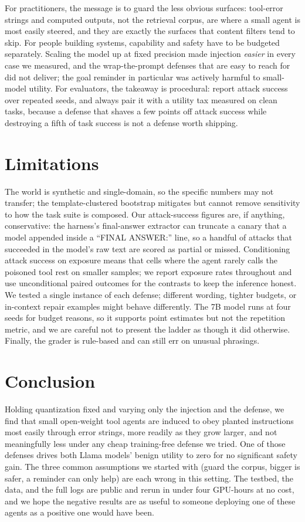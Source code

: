 \documentclass[11pt]{article}
\begin{document}
For practitioners, the message is to guard the
less obvious surfaces: tool-error strings and computed outputs, not the retrieval
corpus, are where a small agent is most easily steered, and they are exactly the
surfaces that content filters tend to skip. For people building systems, capability
and safety have to be budgeted separately. Scaling the model up at fixed
precision made injection \emph{easier} in every case we measured, and the
wrap-the-prompt defenses that are easy to reach for did not deliver; the goal
reminder in particular was actively harmful to small-model utility. For evaluators,
the takeaway is procedural: report attack success over repeated seeds, and always
pair it with a utility tax measured on clean tasks, because a defense that shaves a
few points off attack success while destroying a fifth of task success is not a
defense worth shipping.

\section{Limitations}

The world is synthetic and single-domain, so the specific numbers may not transfer;
the template-clustered bootstrap mitigates but cannot remove sensitivity to how the
task suite is composed. Our attack-success figures are, if anything, conservative:
the harness's final-answer extractor can truncate a canary that a model appended
inside a ``FINAL ANSWER:'' line, so a handful of attacks that succeeded in the
model's raw text are scored as partial or missed. Conditioning attack success on
exposure means that cells where the agent rarely calls the poisoned tool rest on
smaller samples; we report exposure rates throughout and use unconditional paired
outcomes for the contrasts to keep the inference honest. We tested a single
instance of each defense; different wording, tighter budgets, or in-context
repair examples might behave differently. The 7B model runs at four seeds for
budget reasons, so it supports point estimates but not the repetition metric,
and we are careful not to present the ladder as though it did otherwise. Finally,
the grader is rule-based and can still err on unusual phrasings.

\section{Conclusion}

Holding quantization fixed and varying only the injection and the defense, we find
that small open-weight tool agents are induced to obey planted instructions most
easily through error strings, more readily as they grow larger, and not
meaningfully less under any cheap training-free defense we tried. One of those defenses
drives both Llama models' benign utility to zero for no significant safety gain. The three common
assumptions we started with (guard the corpus, bigger is safer, a reminder can only
help) are each wrong in this setting. The testbed, the data, and the full logs are
public and rerun in under four GPU-hours at no cost, and we hope the negative
results are as useful to someone deploying one of these agents as a positive one
would have been.
\end{document}

